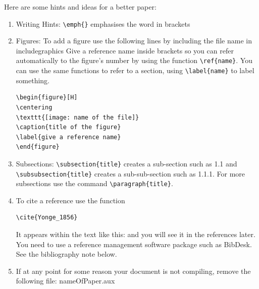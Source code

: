 \documentclass[ a4paper, 12pt, oneside ]{article} %
\begin{document}
{Here are some hints and ideas for a better paper:
\begin{enumerate}
\item{ Writing Hints:
\verb*|\emph{}| emphasises the word in brackets}

\item{ Figures:
To add a figure use the following lines by including the file name in includegraphics 
Give a reference name inside \label{} brackets so you can refer automatically to the figure's number by using the function \verb*|\ref{name}|. You can use the same functions to refer to a section, using \verb*|\label{name}| to label something.

\begin{verbatim}
\begin{figure}[H] 
\centering
\texttt{[image: name of the file]} 
\caption{title of the figure}
\label{give a reference name}
\end{figure}
\end{verbatim}
}

\item{Subsections: 
\verb*|\subsection{title}| creates a sub-section such as 1.1 and \verb*|\subsubsection{title}| creates a sub-sub-section such as 1.1.1. For more subsections use the command \verb*|\paragraph{title}|. }
\item{To cite a reference use the function \begin{verbatim}\cite{Yonge_1856}\end{verbatim} It appears within the text like this: \cite{Yonge_1856} and you will see it in the references later. You need to use a reference management software package such as BibDesk. See the bibliography note below.}

\item{If at any point for some reason your document is not compiling, remove the following file: nameOfPaper.aux}


\end{enumerate}}
\end{document}
